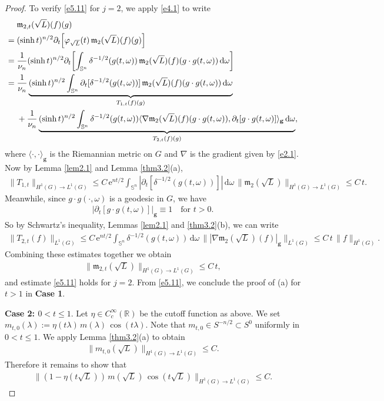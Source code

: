 \documentclass[a4paper,12pt]{amsart}
\numberwithin{equation}{section}
\theoremstyle{definition}
\theoremstyle{remark}
\numberwithin{theorem}{section}
\newcommand{\R}{\mathbb{R}}
\newcommand{\e}{\mathrm{e}}
\renewcommand{\SS}{\mathbb{S}}
\renewcommand{\d}{\mathrm{d}}
\begin{document}
\begin{proof}
To verify \eqref{e5.11} for $j=2$, we apply \eqref{e4.1} to write
\begin{align*}
{}&\mathfrak{m}_{2,t}(\sqrt{L})(f)(g)\\
={}&(\sinh t)^{n/2}\partial_t\!\left[\varphi_{\sqrt{L}}(t)\,\mathfrak{m}_2(\sqrt{L})(f)(g)\right]\\
={}&{1\over\nu_n}(\sinh t)^{n/2}\partial_t\!\left[\int_{\SS^n}\delta^{-1/2}(g(t,\omega))\,\mathfrak{m}_2(\sqrt{L})(f)(g\cdot g(t,\omega))\,\d\omega\right]\\
={}&{1\over\nu_n}\underbrace{(\sinh t)^{n/2}\int_{\SS^n}\partial_t[\delta^{-1/2}(g(t,\omega))]\,\mathfrak{m}_2(\sqrt{L})(f)(g\cdot g(t,\omega))\,\d\omega}_{T_{1,t}(f)(g)}\\
{}&+{1\over\nu_n}\underbrace{(\sinh t)^{n/2}\int_{\SS^n}\delta^{-1/2}(g(t,\omega))\langle\nabla \mathfrak{m}_2(\sqrt{L})(f)(g\cdot g(t,\omega)),\partial_t[g\cdot g(t,\omega)]\rangle_{\mathbf{g}}\,\d \omega}_{T_{2,t}(f)(g)},
\end{align*}
where $\langle\cdot,\cdot\rangle_{\mathbf{g}}$ is the Riemannian metric on $G$ and $\nabla$ is the gradient given by \eqref{e2.1}. Now by Lemma \ref{lem2.1} and Lemma \ref{thm3.2}(a),
\begin{align*}
\|T_{1,t}\|_{H^1(G)\to L^1(G)}\leq C\,\e^{nt/2}\int_{\SS^n}|\partial_t[\delta^{-1/2}(g(t,\omega))]|\,\d\omega\,\|\mathfrak{m}_2(\sqrt{L})\|_{H^1(G)\to L^1(G)}\leq C\,t.
\end{align*}
Meanwhile, since $g\cdot g(\cdot,\omega)$ is a geodesic in $G$, we have
\begin{align*}
|\partial_t[g\cdot g(t,\omega)]|_{\mathbf{g}}\equiv1\quad \mbox{for }t>0.
\end{align*}
So by Schwartz's inequality, Lemmas \ref{lem2.1} and \ref{thm3.2}(b), we can write
\begin{align*}
\|T_{2,t}(f)\|_{L^1(G)}\leq C\,\e^{nt/2}\int_{\SS^n}\delta^{-1/2}(g(t,\omega))\,\d \omega\,\||\nabla\mathfrak{m}_2(\sqrt{L})(f)|_{\mathbf{g}}\|_{L^1(G)}\leq C\,t\,\|f\|_{H^1(G)}.
\end{align*}
Combining these estimates together we obtain
\begin{align*}
\|\mathfrak{m}_{2,t}(\sqrt{L})\|_{H^1(G)\to L^1(G)}\leq C\,t,
\end{align*}
and estimate \eqref{e5.11} holds for $j=2$. From \eqref{e5.11}, we conclude the proof of (a) for $t>1$ in {\bf Case 1}.
\medskip

\noindent
{\bf Case 2: $0<t\leq 1$}. Let $\eta\in C^\infty_c(\R)$ be the cutoff function as above. We set $m_{t,0}(\lambda):=\eta(t\lambda)\,m(\lambda)\,\cos(t\lambda)$. Note that $m_{t,0}\in S^{-n/2}\subset S^0$ uniformly in $0<t\leq 1$. We apply Lemma \ref{thm3.2}(a) to obtain
\begin{align*}
\|m_{t,0}(\sqrt{L})\|_{H^1(G)\to L^1(G)}\leq C.
\end{align*}
Therefore it remains to show that
\begin{align}\label{e5.4}
\|(1-\eta(t\sqrt{L}))\,m(\sqrt{L})\,\cos(t\sqrt{L})\|_{H^1(G)\to L^1(G)}\leq C.
\end{align}


\end{proof}
\end{document}
